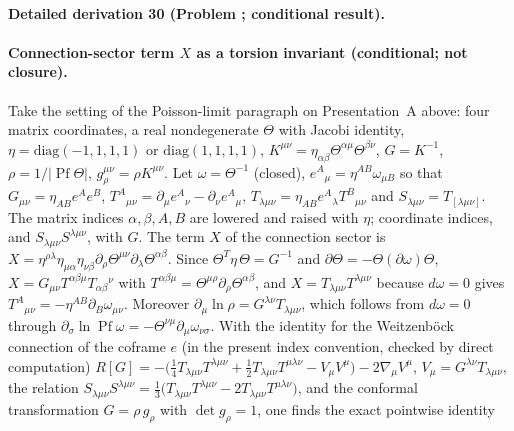 \paragraph{Detailed derivation 30 (Problem ; conditional result).} \label{ref:detail-29} %



\paragraph{Connection-sector term \(X\) as a torsion invariant (conditional; not closure).}

Take the setting of the Poisson-limit paragraph on Presentation~A above: four matrix coordinates, a real nondegenerate \(\Theta\) with Jacobi identity, \(\eta=\mathrm{diag}(-1,1,1,1)\) or \(\mathrm{diag}(1,1,1,1)\), \(K^{\mu\nu}=\eta_{\alpha\beta}\Theta^{\alpha\mu}\Theta^{\beta\nu}\), \(G=K^{-1}\), \(\rho=1/|\operatorname{Pf}\Theta|\), \(g_\rho^{\mu\nu}=\rho K^{\mu\nu}\). Let \(\omega=\Theta^{-1}\) (closed), \(e^A{}_\mu=\eta^{AB}\omega_{\mu B}\) so that \(G_{\mu\nu}=\eta_{AB}e^Ae^B\), \(T^{A}{}_{\mu\nu}=\partial_\mu e^A{}_\nu-\partial_\nu e^A{}_\mu\), \(T_{\lambda\mu\nu}=\eta_{AB}e^A{}_\lambda T^B{}_{\mu\nu}\) and \(S_{\lambda\mu\nu}=T_{[\lambda\mu\nu]}\). The matrix indices \(\alpha,\beta,A,B\) are lowered and raised with \(\eta\); coordinate indices, and \(S_{\lambda\mu\nu}S^{\lambda\mu\nu}\), with \(G\). The term \(X\) of the connection sector is \(X=\eta^{\rho\lambda}\eta_{\mu\alpha}\eta_{\nu\beta}\partial_\rho\Theta^{\mu\nu}\partial_\lambda\Theta^{\alpha\beta}\). Since \(\Theta^{T}\eta\,\Theta=G^{-1}\) and \(\partial\Theta=-\Theta(\partial\omega)\Theta\), \(X=G_{\mu\nu}T^{\alpha\beta\mu}T_{\alpha\beta}{}^{\nu}\) with \(T^{\alpha\beta\mu}=\Theta^{\mu\rho}\partial_\rho\Theta^{\alpha\beta}\), and \(X=T_{\lambda\mu\nu}T^{\lambda\mu\nu}\) because \(d\omega=0\) gives \(T^A{}_{\mu\nu}=-\eta^{AB}\partial_B\omega_{\mu\nu}\). Moreover \(\partial_\mu\ln\rho=G^{\lambda\nu}T_{\lambda\mu\nu}\), which follows from \(d\omega=0\) through \(\partial_\sigma\ln\operatorname{Pf}\omega=-\Theta^{\nu\mu}\partial_\mu\omega_{\nu\sigma}\). With the identity for the Weitzenb\"ock connection of the coframe \(e\) (in the present index convention, checked by direct computation) \(R[G]=-\bigl(\tfrac14T_{\lambda\mu\nu}T^{\lambda\mu\nu}+\tfrac12T_{\lambda\mu\nu}T^{\mu\lambda\nu}-V_\mu V^\mu\bigr)-2\nabla_\mu V^\mu\), \(V_\mu=G^{\lambda\nu}T_{\lambda\mu\nu}\), the relation \(S_{\lambda\mu\nu}S^{\lambda\mu\nu}=\tfrac13\bigl(T_{\lambda\mu\nu}T^{\lambda\mu\nu}-2T_{\lambda\mu\nu}T^{\mu\lambda\nu}\bigr)\), and the conformal transformation \(G=\rho\,g_\rho\) with \(\det g_\rho=1\), one finds the exact pointwise identity

